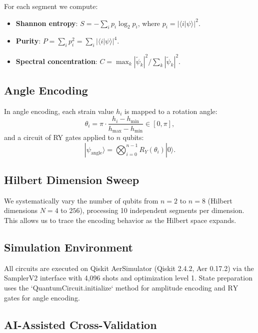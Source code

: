 \documentclass[conference]{IEEEtran}
\begin{document}
For each segment we compute:
\begin{itemize}
  \item \textbf{Shannon entropy}: $S = -\sum_i p_i \log_2 p_i$, where $p_i = |\langle i|\psi\rangle|^2$.
  \item \textbf{Purity}: $P = \sum_i p_i^2 = \sum_i |\langle i|\psi\rangle|^4$.
  \item \textbf{Spectral concentration}: $C = \max_k |\tilde{\psi}_k|^2 / \sum_k |\tilde{\psi}_k|^2$.
\end{itemize}

\subsection{Angle Encoding}

In angle encoding, each strain value $h_i$ is mapped to a rotation angle:
\begin{equation}
\theta_i = \pi \cdot \frac{h_i - h_{\min}}{h_{\max} - h_{\min}} \in [0, \pi],
\end{equation}
and a circuit of RY gates applied to $n$ qubits:
\begin{equation}
|\psi_{\text{angle}}\rangle = \bigotimes_{i=0}^{n-1} R_Y(\theta_i) |0\rangle.
\end{equation}

\subsection{Hilbert Dimension Sweep}

We systematically vary the number of qubits from $n = 2$ to $n = 8$ (Hilbert dimensions $N = 4$ to $256$), processing 10 independent segments per dimension. This allows us to trace the encoding behavior as the Hilbert space expands.

\subsection{Simulation Environment}

All circuits are executed on Qiskit AerSimulator (Qiskit 2.4.2, Aer 0.17.2) via the SamplerV2 interface with 4,096 shots and optimization level 1. State preparation uses the `QuantumCircuit.initialize` method for amplitude encoding and $\mathrm{RY}$ gates for angle encoding.

\subsection{AI-Assisted Cross-Validation}
\end{document}
